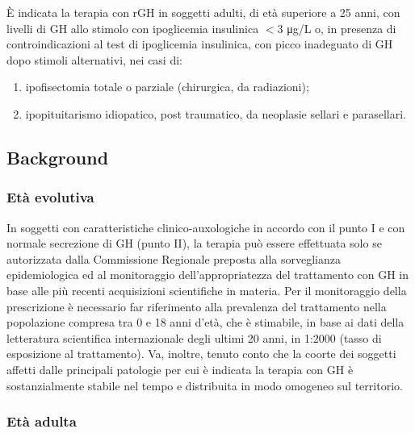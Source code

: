 \`E indicata la terapia con rGH in soggetti adulti, di et\`a superiore a 25 anni, con livelli di GH allo stimolo con
ipoglicemia insulinica $<$3 \unit{\micro g}/L o, in presenza di controindicazioni al test di ipoglicemia insulinica, con picco
inadeguato di GH dopo stimoli alternativi, nei casi di:
\begin{enumerate}
	\renewcommand{\theenumi}{\alph{enumi})}
	\renewcommand{\labelenumi}{\theenumi}
	\item 	ipofisectomia totale o parziale (chirurgica, da radiazioni);
	\item	ipopituitarismo idiopatico, post traumatico, da neoplasie sellari e parasellari.
\end{enumerate}

\subsection*{Background}

\subsubsection*{Et\`a evolutiva}

In soggetti con caratteristiche clinico-auxologiche in accordo con il punto I e con normale secrezione di GH
(punto II), la terapia può essere effettuata solo se autorizzata dalla Commissione Regionale preposta alla
sorveglianza epidemiologica ed al monitoraggio dell'appropriatezza del trattamento con GH in base alle più
recenti acquisizioni scientifiche in materia. Per il monitoraggio della prescrizione \`e necessario far riferimento
alla prevalenza del trattamento nella popolazione compresa tra 0 e 18 anni d'et\`a, che \`e stimabile, in base ai
dati della letteratura scientifica internazionale degli ultimi 20 anni, in 1:2000 (tasso di esposizione al
trattamento). Va, inoltre, tenuto conto che la coorte dei soggetti affetti dalle principali patologie per cui \`e
indicata la terapia con GH \`e sostanzialmente stabile nel tempo e distribuita in modo omogeneo sul territorio.

\subsubsection*{Et\`a adulta}

